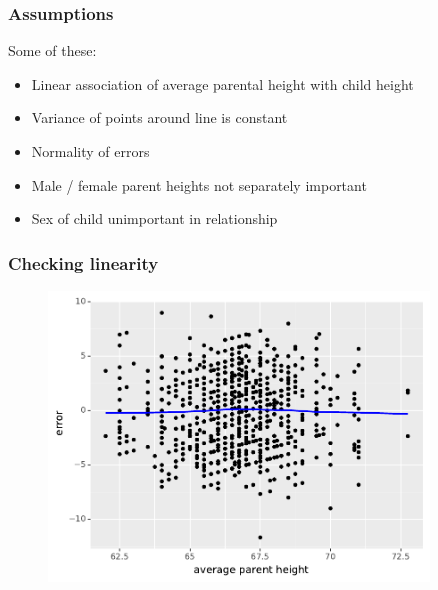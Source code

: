 \documentclass[handout]{beamer}
\begin{document}
\begin{frame}
	\frametitle{Assumptions}
	
	Some of these:
	\begin{itemize}
		\item Linear association of average parental height with child height
		\item Variance of points around line is constant
		\item Normality of errors
		\item Male / female parent heights not separately important
		\item Sex of child unimportant in relationship
		\end{itemize}

\end{frame}

\begin{frame}
	\frametitle{Checking linearity}
	
	\begin{figure}[ht]
		\centerline{\includegraphics[width=0.9\textwidth]{../figures/galton_linearity.pdf}}
	\end{figure}
	
\end{frame}
\end{document}
